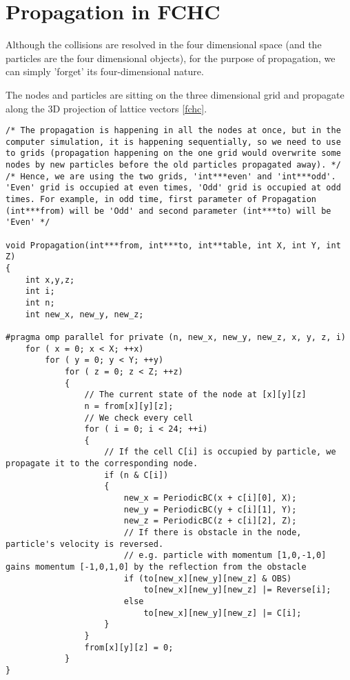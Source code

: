 \section{Propagation in FCHC}
Although the collisions are resolved in the four dimensional space (and the particles are the four dimensional objects), for the purpose of propagation, we can simply 'forget' its four-dimensional nature.

The nodes and particles are sitting on the three dimensional grid and propagate along the 3D projection of lattice vectors \ref{fchc}.

\begin{lstlisting}
/* The propagation is happening in all the nodes at once, but in the computer simulation, it is happening sequentially, so we need to use to grids (propagation happening on the one grid would overwrite some nodes by new particles before the old particles propagated away). */
/* Hence, we are using the two grids, 'int***even' and 'int***odd'. 'Even' grid is occupied at even times, 'Odd' grid is occupied at odd times. For example, in odd time, first parameter of Propagation (int***from) will be 'Odd' and second parameter (int***to) will be 'Even' */

void Propagation(int***from, int***to, int**table, int X, int Y, int Z)
{
	int x,y,z;
	int i;
	int n;
	int new_x, new_y, new_z;

#pragma omp parallel for private (n, new_x, new_y, new_z, x, y, z, i)
	for ( x = 0; x < X; ++x)
		for ( y = 0; y < Y; ++y)
			for ( z = 0; z < Z; ++z)
			{
				// The current state of the node at [x][y][z]				
				n = from[x][y][z];
				// We check every cell
				for ( i = 0; i < 24; ++i)
				{
					// If the cell C[i] is occupied by particle, we propagate it to the corresponding node. 
					if (n & C[i])
					{
						new_x = PeriodicBC(x + c[i][0], X);
						new_y = PeriodicBC(y + c[i][1], Y);
						new_z = PeriodicBC(z + c[i][2], Z);
						// If there is obstacle in the node, particle's velocity is reversed.
						// e.g. particle with momentum [1,0,-1,0] gains momentum [-1,0,1,0] by the reflection from the obstacle
						if (to[new_x][new_y][new_z] & OBS)
							to[new_x][new_y][new_z] |= Reverse[i];
						else
							to[new_x][new_y][new_z] |= C[i];
					}
				}
				from[x][y][z] = 0;
			}
}
\end{lstlisting}
